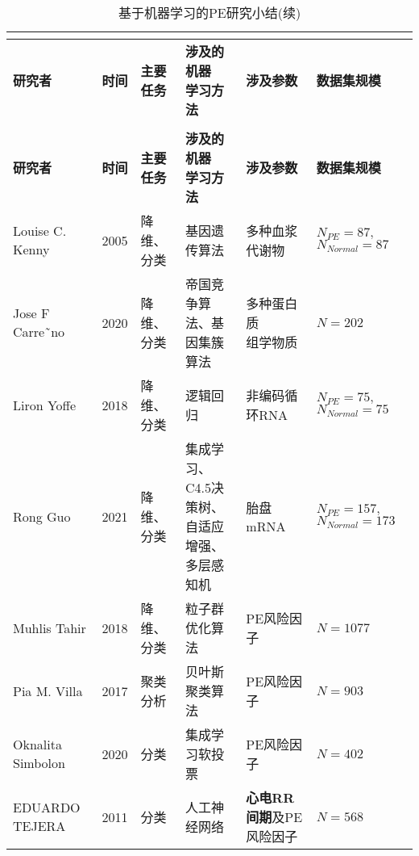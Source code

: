 \begin{center}
    \fontsize{10}{4}
	\begin{longtable}{p{3cm}<{\centering}p{0.8cm}<{\centering}p{1.8cm}<{\centering}p{3.5cm}<{\centering}p{3cm}<{\centering}p{2cm}<{\centering}}
		\caption{基于机器学习的PE研究小结}\\
		\label{tab:AIinPE}\\
		\hline
            \textbf{研究者}&\textbf{时间}&\textbf{主要任务}&\tabincell{c}{\textbf{涉及的机器}\\\textbf{学习方法}}&\textbf{涉及参数}&\textbf{数据集规模}\\
        \hline
        \endfirsthead
        \caption{基于机器学习的PE研究小结(续)}\\
        \hline
            \textbf{研究者}&\textbf{时间}&\textbf{主要任务}&\tabincell{c}{\textbf{涉及的机器}\\\textbf{学习方法}}&\textbf{涉及参数}&\textbf{数据集规模}\\
        \hline
        \endhead 
        \hline
        \endfoot
            Louise C. Kenny\cite{Kenny2005}&2005&降维、分类&基因遗传算法&多种血浆代谢物&\tabincell{c}{$N_{PE}=87,$\\$N_{Normal}=87$}\\
            Jose F Carre˜no\cite{Carreno2020}&2020&降维、分类&帝国竞争算法、基因集簇算法&\tabincell{c}{多种蛋白质\\组学物质}&$N=202$\\
            Liron Yoffe\cite{Yoffe2018}&2018&降维、分类&逻辑回归&非编码循环RNA&\tabincell{c}{$N_{PE}=75,$\\$N_{Normal}=75$}\\
            Rong Guo\cite{Guo2021}&2021&降维、分类&\tabincell{c}{集成学习、 C4.5决策树、\\自适应增强、多层感知机}&胎盘mRNA&\tabincell{c}{$N_{PE}=157,$\\$N_{Normal}=173$}\\
            Muhlis Tahir\cite{Tahir2018,Tahir2018-2}&2018&降维、分类&粒子群优化算法&PE风险因子&$N=1077$\\
            Pia M. Villa\cite{Villa2017}&2017&聚类分析&贝叶斯聚类算法&PE风险因子&$N=903$\\
            Oknalita Simbolon\cite{Simbolon2020}&2020&分类&集成学习软投票&PE风险因子&$N=402$\\
            EDUARDO TEJERA\cite{Tejera2011}&2011&分类&人工神经网络&\textbf{心电RR间期}及PE风险因子&$N=568$\\

\end{longtable}
\end{center}
